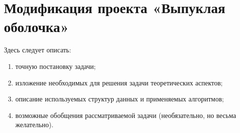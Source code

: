 \section{Модификация проекта «Выпуклая оболочка»}

Здесь следует описать:

\begin{enumerate}[1)]
\item точную постановку задачи; 
\item изложение необходимых для решения задачи теоретических аспектов;
\item описание используемых структур данных и применяемых алгоритмов;
\item возможные обобщения рассматриваемой задачи (необязательно, но 
      весьма желательно).
\end{enumerate}
